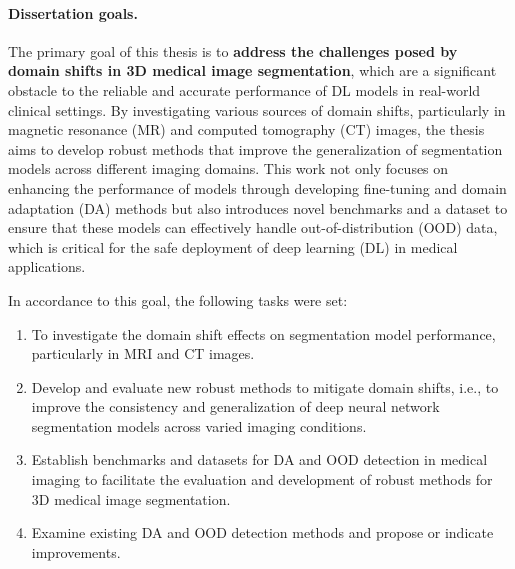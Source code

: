 
\paragraph{Dissertation goals.}

The primary goal of this thesis is to \textbf{address the challenges posed by domain shifts in 3D medical image segmentation}, which are a significant obstacle to the reliable and accurate performance of DL models in real-world clinical settings. By investigating various sources of domain shifts, particularly in magnetic resonance (MR) and computed tomography (CT) images, the thesis aims to develop robust methods that improve the generalization of segmentation models across different imaging domains. This work not only focuses on enhancing the performance of models through developing fine-tuning and domain adaptation (DA) methods but also introduces novel benchmarks and a dataset to ensure that these models can effectively handle out-of-distribution (OOD) data, which is critical for the safe deployment of deep learning (DL) in medical applications.

In accordance to this goal, the following tasks were set:


\begin{enumerate}
    \item To investigate the domain shift effects on segmentation model performance, particularly in MRI and CT images.
    \item Develop and evaluate new robust methods to mitigate domain shifts, i.e., to improve the consistency and generalization of deep neural network segmentation models across varied imaging conditions.
    \item Establish benchmarks and datasets for DA and OOD detection in medical imaging to facilitate the evaluation and development of robust methods for 3D medical image segmentation.
    \item Examine existing DA and OOD detection methods and propose or indicate improvements.
\end{enumerate}


